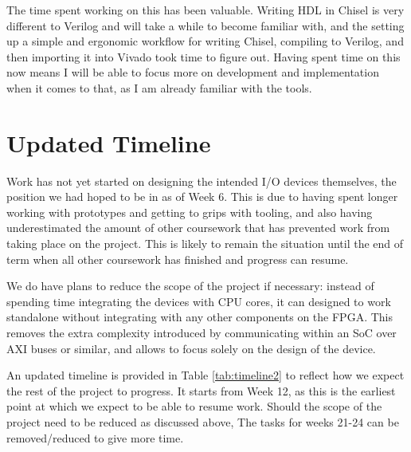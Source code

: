 \documentclass[a4paper,fleqn,12pt]{article}
\begin{document}
The time spent working on this has been valuable. Writing HDL in Chisel is very different to Verilog and will take a while to become familiar with, and the setting up a simple and ergonomic workflow for writing Chisel, compiling to Verilog, and then importing it into Vivado took time to figure out. Having spent time on this now means I will be able to focus more on development and implementation when it comes to that, as I am already familiar with the tools.

\section{Updated Timeline}

Work has not yet started on designing the intended I/O devices themselves, the position we had hoped to be in as of Week 6. This is due to having spent longer working with prototypes and getting to grips with tooling, and also having underestimated the amount of other coursework that has prevented work from taking place on the project. This is likely to remain the situation until the end of term when all other coursework has finished and progress can resume.

We do have plans to reduce the scope of the project if necessary: instead of spending time integrating the devices with CPU cores, it can designed to work standalone without integrating with any other components on the FPGA. This removes the extra complexity introduced by communicating within an SoC over AXI buses or similar, and allows to focus solely on the design of the device.

An updated timeline is provided in Table \ref{tab:timeline2} to reflect how we expect the rest of the project to progress. It starts from Week 12, as this is the earliest point at which we expect to be able to resume work. Should the scope of the project need to be reduced as discussed above, The tasks for weeks 21-24 can be removed/reduced to give more time.
\end{document}
